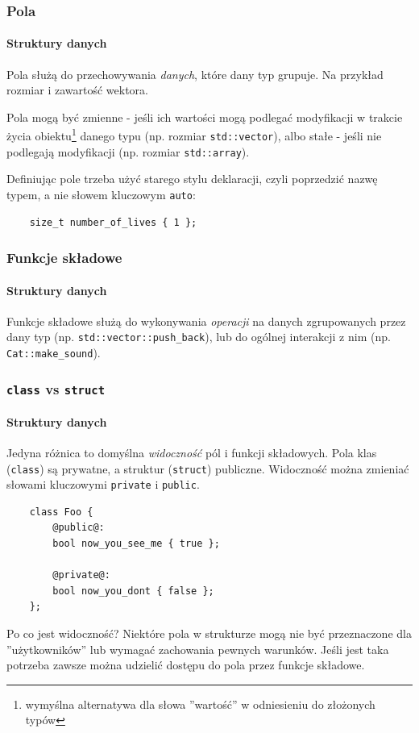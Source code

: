 \documentclass[aspectratio=169]{beamer}
\begin{document}
\begin{frame}[fragile]
    \frametitle{Pola}
    \framesubtitle{Struktury danych}

    Pola służą do przechowywania \emph{danych}, które dany typ grupuje. Na
    przykład rozmiar i zawartość wektora.

    Pola mogą być zmienne - jeśli ich wartości mogą podlegać modyfikacji w
    trakcie życia obiektu\footnote{wymyślna alternatywa dla słowa ''wartość'' w
    odniesieniu do złożonych typów} danego typu (np. rozmiar {\tt std::vector}),
    albo stałe - jeśli nie podlegają modyfikacji (np. rozmiar {\tt std::array}).

    \vspace{1em}

    Definiując pole trzeba użyć starego stylu deklaracji, czyli poprzedzić nazwę
    typem, a nie słowem kluczowym {\tt auto}:

    {\scriptsize
    \begin{lstlisting}
    size_t number_of_lives { 1 };
    \end{lstlisting}}
\end{frame}

\begin{frame}
    \frametitle{Funkcje składowe}
    \framesubtitle{Struktury danych}

    Funkcje składowe służą do wykonywania \emph{operacji} na danych zgrupowanych
    przez dany typ (np. {\tt std::vector::push\_back}), lub do ogólnej
    interakcji z nim (np. {\tt Cat::make\_sound}).
\end{frame}

\begin{frame}[fragile]
    \frametitle{{\tt class} vs {\tt struct}}
    \framesubtitle{Struktury danych}

    Jedyna różnica to domyślna \emph{widoczność} pól i funkcji składowych. Pola
    klas ({\tt class}) są prywatne, a struktur ({\tt struct}) publiczne.
    Widoczność można zmieniać słowami kluczowymi {\tt private} i {\tt public}.

    {\scriptsize
    \begin{lstlisting}
    class Foo {
        @public@:
        bool now_you_see_me { true };

        @private@:
        bool now_you_dont { false };
    };
    \end{lstlisting}}

    Po co jest widoczność? Niektóre pola w strukturze mogą nie być przeznaczone
    dla ''użytkowników'' lub wymagać zachowania pewnych warunków. Jeśli jest
    taka potrzeba zawsze można udzielić dostępu do pola przez funkcje składowe.
\end{frame}
\end{document}

